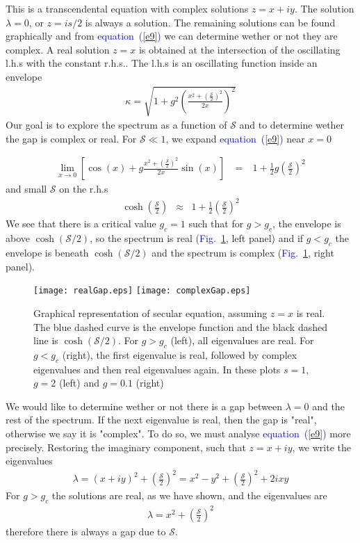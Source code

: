 \documentclass[aps,pre,floats,floatfix,fleqn,notitlepage]{revtex4-1}
\newcommand{\beq}{\begin{eqnarray}}
\newcommand{\eeq}{\end{eqnarray}}
\newcommand{\Eq}[1]{\textcolor{blue}{equation~(\ref{#1})}} %
\newcommand{\Fig}[1] {\textcolor{blue}{Fig.~\ref{#1}}} %
\begin{document}
This is a transcendental equation with complex solutions $z=x+iy$. 
The solution $\lambda=0$, or $z=is/2$ is always a solution.
The remaining solutions can be found graphically and
from \Eq{e9} we can determine wether or not they are complex. 
A real solution $z=x$ is obtained at the intersection
of the oscillating l.h.s with the constant r.h.s..
The l.h.s is an oscillating function inside an envelope
%
\beq
\kappa = \sqrt{1+g^2 \left( \frac{x^2+(\frac{\mathcal{S}}{2})^2}{2x} \right)^2}
\eeq
%
Our goal is to explore the spectrum as a function of $\mathcal{S}$ and to determine 
wether the gap is complex or real.
%
For $\mathcal{S} \ll 1$, we expand \Eq{e9} near $x=0$

%
\beq
\lim_{x\to 0} \left[ \cos(x) + g \frac{x^2+(\frac{\mathcal{S}}{2})^2}{2x}\sin(x)\right] \ &=& \ 1+\frac{1}{2}g\left(\frac{\mathcal{S}}{2}\right)^2
\eeq
%
and small $\mathcal{S}$ on the r.h.s
%
\beq
\cosh\left(\frac{\mathcal{S}}{2}\right) & \approx & 1+\frac{1}{2}\left(\frac{\mathcal{S}}{2}\right)^2
\eeq
%
We see that there is a critical value $g_c=1$
such that for $g > g_c $, the envelope is above $\cosh(\mathcal{S}/2)$, so  the spectrum is real (\Fig{fig1}, left panel) and if  $g<g_c$ the envelope is beneath $\cosh(\mathcal{S}/2)$ and the spectrum is complex (\Fig{fig1}, right panel).

\begin{figure}[h]
\texttt{[image: realGap.eps]}
\texttt{[image: complexGap.eps]}
\caption{Graphical representation of secular equation, assuming $z=x$ is real. The blue dashed curve is the envelope function and the black dashed line is $\cosh(\mathcal{S}/2)$.  For $g>g_c$ (left), all eigenvalues are real. For $g<g_c$ (right), the first eigenvalue is real, followed by complex eigenvalues and then real eigenvalues again. In these plots $s=1$, $g=2$ (left) and $g=0.1$ (right)}
\label{fig1}
\end{figure}


We would like to determine wether or not there is a gap between $\lambda=0$ and the 
rest of the spectrum. 
If the next eigenvalue is real, then the gap is "real", otherwise we say it is "complex". 
To do so, we must analyse \Eq{e9} more precisely. 
Restoring the imaginary component, such that $z=x+iy$, we write the eigenvalues
%
\beq
\lambda = (x+iy)^2+\left(\frac{\mathcal{S}}{2}\right)^2 = x^2-y^2 + \left(\frac{\mathcal{S}}{2}\right)^2 +2ixy
\eeq
%
For $g>g_c$ the solutions are real, as we have shown, and the eigenvalues are 
%
\beq
\lambda = x^2+ \left(\frac{\mathcal{S}}{2}\right)^2
\eeq
%
therefore there is always a gap due to $\mathcal{S}$. 
%
\end{document}
